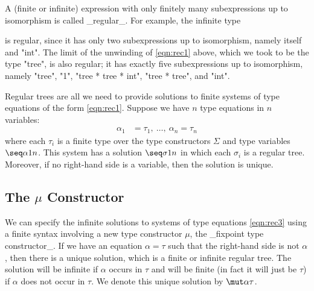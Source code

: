 A (finite or infinite) expression with only finitely many subexpressions up to isomorphism is called _regular_. For example, the infinite type
\begin{center}
\end{center}
is regular, since it has only two subexpressions up to isomorphism, namely itself and "int". The limit of the unwinding of \eqref{eqn:rec1} above, which we took to be the type "tree", is also regular; it has exactly five subexpressions up to isomorphism, namely "tree", "1", "tree * tree * int", "tree * tree", and "int".

Regular trees are all we need to provide solutions to finite systems of type equations of the form \eqref{eqn:rec1}. Suppose we have $n$ type equations in $n$ variables:
\begin{align}
\alpha_1 &= \tau_1,\ \ldots,\ \alpha_n = \tau_n\label{eqn:rec3}
\end{align}
where each $\tau_i$ is a finite type over the type constructors $\Sigma$ and type variables $\seq\alpha 1n$. This system has a solution $\seq\sigma 1n$ in which each $\sigma_i$ is a regular tree. Moreover, if no right-hand side is a variable, then the solution is unique.

\subsection{The $\mu$ Constructor}

We can specify the infinite solutions to systems of type equations \eqref{eqn:rec3} using a finite syntax involving a new type constructor $\mu$, the _fixpoint type constructor_. If we have an equation $\alpha = \tau$ such that the right-hand side is not $\alpha$, then there is a unique solution, which is a finite or infinite regular tree. The solution will be infinite if $\alpha$ occurs in $\tau$ and will be finite (in fact it will just be $\tau$) if $\alpha$ does not occur in $\tau$. We denote this unique solution by $\mut\alpha\tau$.

